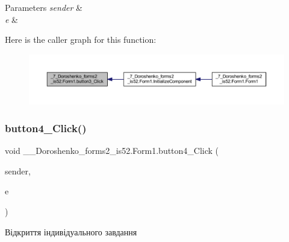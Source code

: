 \begin{DoxyParams}{Parameters}
{\em sender} & \\
\hline
{\em e} & \\
\hline
\end{DoxyParams}
Here is the caller graph for this function\+:
\nopagebreak
\begin{figure}[H]
\begin{center}
\leavevmode
\includegraphics[width=350pt]{class__7___doroshenko__forms2__is52_1_1_form1_a2057eaec9016139eb5b5dca1ccb19f25_icgraph}
\end{center}
\end{figure}
\hypertarget{class__7___doroshenko__forms2__is52_1_1_form1_aed668b01be973700ab8589f694f9e0b9}{}\label{class__7___doroshenko__forms2__is52_1_1_form1_aed668b01be973700ab8589f694f9e0b9} 
\subsubsection{\texorpdfstring{button4\+\_\+\+Click()}{button4\_Click()}}
{\footnotesize\ttfamily void \+\_\+\_\+\+Doroshenko\+\_\+forms2\+\_\+is52.\+Form1.\+button4\+\_\+\+Click (\begin{DoxyParamCaption}\item[{object}]{sender,  }\item[{Event\+Args}]{e }\end{DoxyParamCaption})\hspace{0.3cm}{\ttfamily [private]}}



Відкриття індивідуального завдання 


